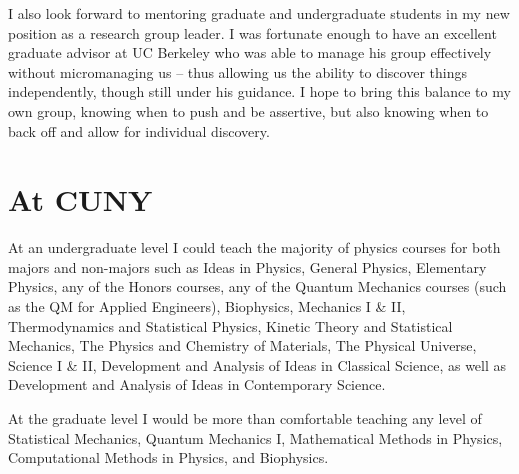 \documentclass[11pt]{article}
\begin{document}
I also look forward to mentoring graduate and undergraduate students in my new position as a research group leader.  I was fortunate enough to have an excellent graduate advisor at UC Berkeley who was able to manage his group effectively without micromanaging us -- thus allowing us the ability to discover things independently, though still under his guidance.  I hope to bring this balance to my own group, knowing when to push and be assertive, but also knowing when to back off and allow for individual discovery.

\section{At CUNY} %

At an undergraduate level I could teach the majority of physics courses for both majors and non-majors such as Ideas in Physics, General Physics, Elementary Physics, any of the Honors courses, any of the Quantum Mechanics courses (such as the QM for Applied Engineers), Biophysics, Mechanics I \& II, Thermodynamics and Statistical Physics, Kinetic Theory and Statistical Mechanics, The Physics and Chemistry of Materials, The Physical Universe, Science I \& II, Development and Analysis of Ideas in Classical Science, as well as Development and Analysis of Ideas in Contemporary Science.

At the graduate level I would be more than comfortable teaching any level of Statistical Mechanics, Quantum Mechanics I, Mathematical Methods in Physics, Computational Methods in Physics, and Biophysics.
\end{document}
